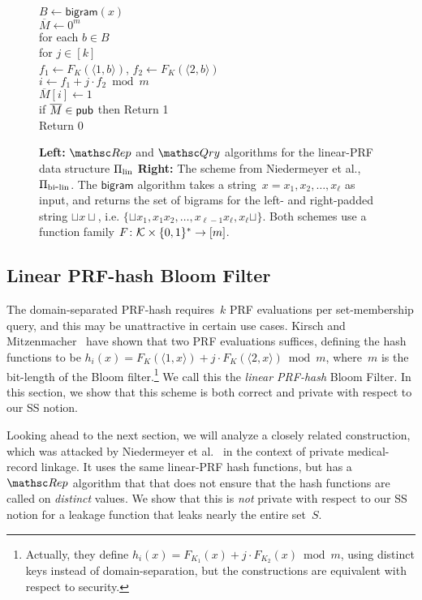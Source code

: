 \begin{figure}[tp]
{\medskip
{}\\
$B \gets \mathsf{bigram}(x)$\\
$\overline{M} \gets 0^m$\\
for each $b \in B$\\
\nudge for $j \in [k]$\\
\nudge\nudge $f_1 \gets F_{K}(\langle 1,b \rangle)$, $f_2 \gets F_{K}(\langle 2,b \rangle)$\\
\nudge\nudge $i \gets f_1+j\cdot f_2 \bmod m$\\
\nudge\nudge $\overline{M}[i] \gets 1$\\
if $\overline{M} \in {\sf pub}$ then Return 1 \\
Return 0
}
\caption{{\bf Left:} $\Rep$ and $\Qry$ algorithms for the linear-PRF
  data structure $\Pi_{\mathrm{lin}}$ {\bf Right:}
The scheme from Niedermeyer et al.\cite{niedermeyer2014cryptanalysis}, $\Pi_{\mathrm{bi}\mbox{-}\mathrm{lin}}$.
The $\mathsf{bigram}$ algorithm takes a
string~$x=x_1,x_2,\ldots,x_\ell$ as input, and returns the set of
bigrams for the left- and right-padded string $\sqcup x \sqcup$,
i.e. $\{\sqcup x_1, x_1x_2,\ldots,x_{\ell-1}x_\ell,x_\ell\sqcup\}$.
Both schemes use a function family $F\colon {\cal K} \times \{0,1\}^* \to [m]$.
}\label{fig:lin-and-bi-lin}
\label{fig:niedermeyer}
\end{figure}

\subsection{Linear PRF-hash Bloom Filter }
The domain-separated PRF-hash requires~$k$ PRF evaluations per set-membership query, and this may be unattractive in certain use cases.  Kirsch and Mitzenmacher~\cite{kirsch2006less} have shown that two PRF evaluations suffices, defining the hash functions to be $h_i(x)=F_K(\langle 1,x \rangle) + j\cdot F_K(\langle 2,x \rangle) \bmod m$, where~$m$ is the bit-length of the Bloom filter.\footnote{Actually, they define $h_i(x)=F_{K_1}(x)  + j\cdot F_{K_2}(x) \bmod m$, using distinct keys instead of domain-separation, but the constructions are equivalent with respect to security.} We call this the \emph{linear PRF-hash} Bloom Filter.  In this section, we show that this scheme is both correct and private with respect to our SS notion.

Looking ahead to the next section, we will analyze a closely related construction, which was attacked by Niedermeyer et al.~\cite{niedermeyer2014cryptanalysis} in the context of private medical-record linkage.  It uses the same linear-PRF hash functions, but has a $\Rep$ algorithm that that does not ensure that the hash functions are called on \emph{distinct} values.  We show that this is \emph{not} private with respect to our SS notion for a leakage function that leaks nearly the entire set~$S$. 

